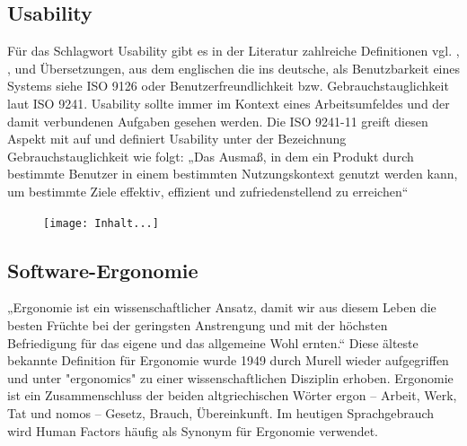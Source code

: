 \documentclass[a4paper, 12pt, twoside, BCOR=20mm, DIV=calc, abstracton, parskip=half*, toc=bibliography, toc=listof, headsepline, footsepline, headings=small, numbers=enddot]{scrreprt}
\begin{document}
	\subsection{Usability}
	Für das Schlagwort Usability gibt es in der Literatur zahlreiche Definitionen vgl. \cite[S.3]{balzert2009webdesign}, \cite[]{herczeg2005software}, \cite[S.9]{kerkau2009usability} und Übersetzungen, aus dem englischen die ins deutsche, als Benutzbarkeit eines Systems siehe ISO 9126 oder Benutzerfreundlichkeit bzw. Gebrauchstauglichkeit laut ISO 9241. %
	Usability sollte immer im Kontext eines Arbeitsumfeldes und der damit verbundenen Aufgaben gesehen werden. Die ISO 9241-11 greift diesen Aspekt mit auf und definiert Usability unter der Bezeichnung Gebrauchstauglichkeit wie folgt:
	„Das Ausmaß, in dem ein Produkt durch bestimmte Benutzer in einem bestimmten Nutzungskontext genutzt werden kann, um bestimmte Ziele effektiv, effizient und zufriedenstellend zu erreichen“\cite[S. 4]{ISO9241}
	\begin{figure}
\texttt{[image: 	Inhalt...]}
	\end{figure}
	\subsection{Software-Ergonomie}
	„Ergonomie ist ein wissenschaftlicher Ansatz, damit wir aus diesem Leben die besten Früchte bei der geringsten Anstrengung und mit der höchsten Befriedigung für das eigene und das allgemeine Wohl ernten.“\cite[Jastrzebowski 1857]{herczeg2005software} 
	Diese älteste bekannte Definition für Ergonomie wurde 1949 durch Murell wieder aufgegriffen und unter "ergonomics" zu einer wissenschaftlichen Disziplin erhoben. Ergonomie ist ein Zusammenschluss der beiden altgriechischen Wörter ergon – Arbeit, Werk, Tat und nomos – Gesetz, Brauch, Übereinkunft. Im heutigen Sprachgebrauch wird Human Factors häufig als Synonym für Ergonomie verwendet.\cite[]{richter2010usability}
		
\end{document}

